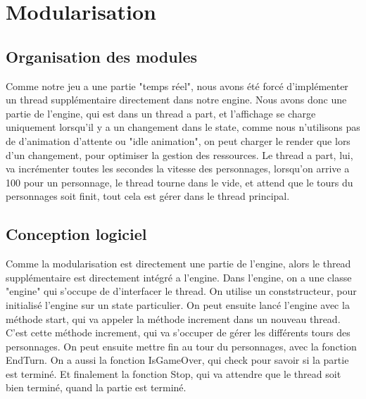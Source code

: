 \documentclass[a4paper,12pt]{article}
\begin{document}
\section{Modularisation}
\label{sec:module}

\subsection{Organisation des modules}

Comme notre jeu a une partie "temps réel", nous avons été forcé d'implémenter un thread supplémentaire
directement dans notre engine.
Nous avons donc une partie de l'engine, qui est dans un thread a part, et l'affichage se charge uniquement
lorsqu'il y a un changement dans le state, comme nous n'utilisons pas de d'animation d'attente ou "idle animation",
on peut charger le render que lors d'un changement, pour optimiser la gestion des ressources.
Le thread a part, lui, va incrémenter toutes les secondes la vitesse des personnages, lorsqu'on arrive a 100 pour un 
personnage, le thread tourne dans le vide, et attend que le tours du personnages soit finit, tout cela est gérer dans 
le thread principal.

\clearpage
\subsection{Conception logiciel}

Comme la modularisation est directement une partie de l'engine, alors le thread supplémentaire est directement
intégré a l'engine. Dans l'engine, on a une classe "engine" qui s'occupe de d'interfacer le thread.
On utilise un conststructeur, pour initialisé l'engine sur un state particulier.
On peut ensuite lancé l'engine avec la méthode start, qui va appeler la méthode increment dans un nouveau thread.
C'est cette méthode increment, qui va s'occuper de gérer les différents tours des personnages.
On peut ensuite mettre fin au tour du personnages, avec la fonction EndTurn.
On a aussi la fonction IsGameOver, qui check pour savoir si la partie est terminé.
Et finalement la fonction Stop, qui va attendre que le thread soit bien terminé, quand la partie est terminé.
\end{document}
